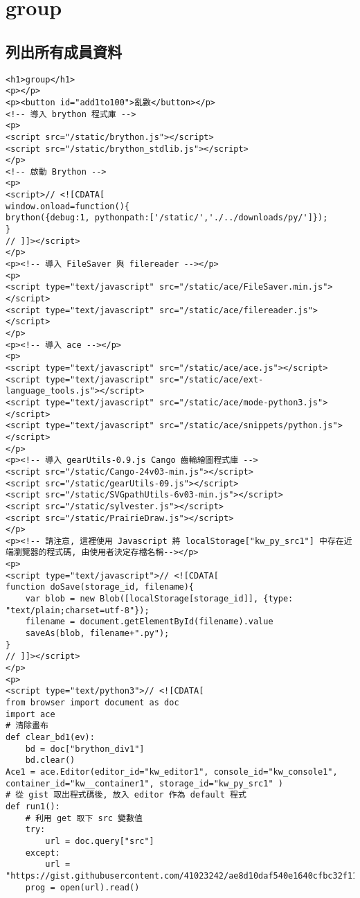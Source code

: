 \chapter{group}
\section{列出所有成員資料}
\begin{lstlisting}
<h1>group</h1>
<p></p>
<p><button id="add1to100">亂數</button></p>
<!-- 導入 brython 程式庫 -->
<p>
<script src="/static/brython.js"></script>
<script src="/static/brython_stdlib.js"></script>
</p>
<!-- 啟動 Brython -->
<p>
<script>// <![CDATA[
window.onload=function(){
brython({debug:1, pythonpath:['/static/','./../downloads/py/']});
}
// ]]></script>
</p>
<p><!-- 導入 FileSaver 與 filereader --></p>
<p>
<script type="text/javascript" src="/static/ace/FileSaver.min.js"></script>
<script type="text/javascript" src="/static/ace/filereader.js"></script>
</p>
<p><!-- 導入 ace --></p>
<p>
<script type="text/javascript" src="/static/ace/ace.js"></script>
<script type="text/javascript" src="/static/ace/ext-language_tools.js"></script>
<script type="text/javascript" src="/static/ace/mode-python3.js"></script>
<script type="text/javascript" src="/static/ace/snippets/python.js"></script>
</p>
<p><!-- 導入 gearUtils-0.9.js Cango 齒輪繪圖程式庫 -->
<script src="/static/Cango-24v03-min.js"></script>
<script src="/static/gearUtils-09.js"></script>
<script src="/static/SVGpathUtils-6v03-min.js"></script>
<script src="/static/sylvester.js"></script>
<script src="/static/PrairieDraw.js"></script>
</p>
<p><!-- 請注意, 這裡使用 Javascript 將 localStorage["kw_py_src1"] 中存在近端瀏覽器的程式碼, 由使用者決定存檔名稱--></p>
<p>
<script type="text/javascript">// <![CDATA[
function doSave(storage_id, filename){
    var blob = new Blob([localStorage[storage_id]], {type: "text/plain;charset=utf-8"});
    filename = document.getElementById(filename).value
    saveAs(blob, filename+".py");
}
// ]]></script>
</p>
<p>
<script type="text/python3">// <![CDATA[
from browser import document as doc
import ace
# 清除畫布
def clear_bd1(ev):
    bd = doc["brython_div1"]
    bd.clear()
Ace1 = ace.Editor(editor_id="kw_editor1", console_id="kw_console1", container_id="kw__container1", storage_id="kw_py_src1" )
# 從 gist 取出程式碼後, 放入 editor 作為 default 程式
def run1():
    # 利用 get 取下 src 變數值
    try:
        url = doc.query["src"]
    except:
        url = "https://gist.githubusercontent.com/41023242/ae8d10daf540e1640cfbc32f1114e871/raw/501e3ad784fd19222e98c3b3705e748bfdab2cec/mmmm"
    prog = open(url).read()


\end{lstlisting}
